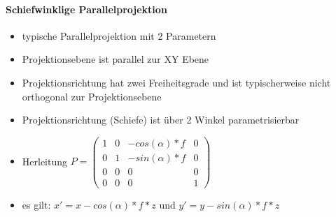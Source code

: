 \documentclass[10pt,landscape]{article}
\begin{document}
\begin{multicols}{3}
\paragraph{Schiefwinklige Parallelprojektion}
\begin{itemize}
  \item typische Parallelprojektion mit 2 Parametern
  \item Projektionsebene ist parallel zur XY Ebene
  \item Projektionsrichtung hat zwei Freiheitsgrade und ist typischerweise nicht orthogonal zur Projektionsebene
  \item Projektionsrichtung (Schiefe) ist über 2 Winkel parametrisierbar
  \item Herleitung $P=\begin{pmatrix}
            1 & 0 & -cos(\alpha)*f & 0  \\
            0 & 1 & -sin(\alpha)*f & 0  \\
            0 & 0 & 0              & 0  \\
            0 & 0 & 0              & 1 
          \end{pmatrix}$
  \item es gilt: $x'=x-cos(\alpha)*f*z$ und $y'=y-sin(\alpha)*f*z$
\end{itemize}


\end{multicols}
\end{document}
